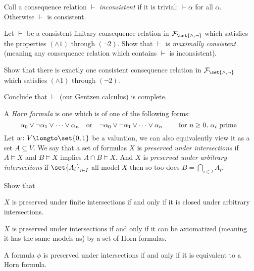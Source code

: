     Call a consequence relation $\vdash$ {\it inconsistent} if it is trivial: $\vdash\alpha$ for
    all $\alpha$.
    Otherwise $\vdash$ is consistent.

    \benum
        \item Let $\vdash$ be a consistent finitary consequence relation in
        ${\cal F}_{\set{{\land},{\neg}}}$ which satisfies the properties $(\land1)$ through
        $(\neg2)$.
        Show that $\vdash$ is {\it maximally consistent} (meaning any consequence relation which
        contains $\vdash$ is inconsistent).
        \item Show that there is exactly one consistent consequence relation in
        ${\cal F}_{\set{{\land},{\neg}}}$ which satisfies $(\land1)$ through $(\neg2)$.
        \item Conclude that $\vdash$ (our Gentzen calculus) is complete.
    \eenum

\eprob

\bprob

    A {\it Horn formula} is one which is of one of the following forms:
    $$ \alpha_0\lor\neg\alpha_1\lor\cdots\lor\alpha_n\hbox{\quad or\quad}
    \neg\alpha_0\lor\neg\alpha_1\lor\cdots\lor\alpha_n\qquad\hbox{ for $n\geq0$, $\alpha_i$ prime}
    $$
    Let $w\colon V\longto\set{0,1}$ be a valuation, we can also equivalently view it as a set
    $A\subseteq V$.
    We say that a set of formulas $X$ is {\it preserved under intersections} if $A\vDash X$ and
    $B\vDash X$ implies $A\cap B\vDash X$.
    And $X$ is {\it preserved under arbitrary intersections} if $\set{A_i}_{i\in I}$ all model $X$
    then so too does $B=\bigcap_{i\in I}A_i$.

    Show that
    \benum
        \item $X$ is preserved under finite intersections if and only if it is closed under
        arbitrary intersections.
        \item $X$ is preserved under intersections if and only if it can be axiomatized (meaning
        it has the same models as) by a set of Horn formulas.
        \item A formula $\phi$ is preserved under intersections if and only if it is equivalent to
        a Horn formula.
    \eenum

\eprob

\bye

